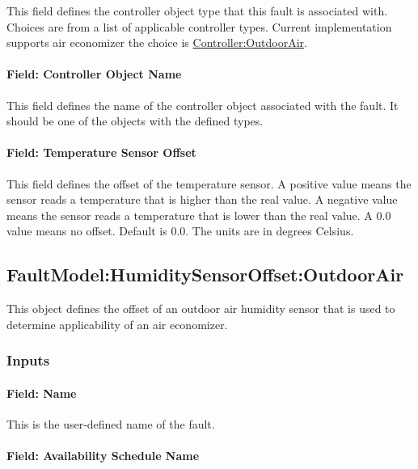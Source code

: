 This field defines the controller object type that this fault is associated with. Choices are from a list of applicable controller types. Current implementation supports air economizer the choice is \hyperref[controlleroutdoorair]{Controller:OutdoorAir}.

\paragraph{Field: Controller Object Name}\label{field-controller-object-name}

This field defines the name of the controller object associated with the fault. It should be one of the objects with the defined types.

\paragraph{Field: Temperature Sensor Offset}\label{field-temperature-sensor-offset}

This field defines the offset of the temperature sensor. A positive value means the sensor reads a temperature that is higher than the real value. A negative value means the sensor reads a temperature that is lower than the real value. A 0.0 value means no offset. Default is 0.0. The units are in degrees Celsius.

\subsection{FaultModel:HumiditySensorOffset:OutdoorAir}\label{faultmodelhumiditysensoroffsetoutdoorair}

This object defines the offset of an outdoor air humidity sensor that is used to determine applicability of an air economizer.

\subsubsection{Inputs}\label{inputs-1-026}

\paragraph{Field: Name}\label{field-name-1-025}

This is the user-defined name of the fault.

\paragraph{Field: Availability Schedule Name}\label{field-availability-schedule-name-1-009}

